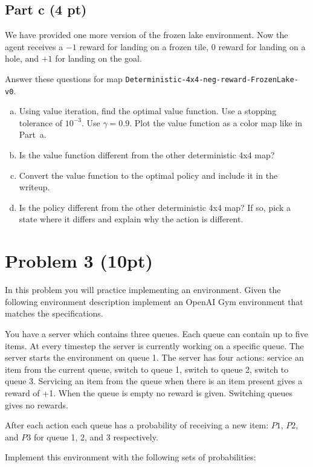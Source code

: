 \documentclass[12pt]{article}
\begin{document}
\subsection*{Part c (4 pt)}

We have provided one more version of the frozen lake environment. Now
the agent receives a $-1$ reward for landing on a frozen tile, $0$
reward for landing on a hole, and $+1$ for landing on the goal.

Answer these questions for map \texttt{Deterministic-4x4-neg-reward-FrozenLake-v0}.

\begin{enumerate}[a)]
\item Using value iteration, find the optimal value function. Use a
  stopping tolerance of $10^{-3}$. Use $\gamma=0.9$. Plot the
  value function as a color map like in Part~a.
\item Is the value function different from the other deterministic 4x4 map?
\item Convert the value function to the optimal policy and include it
  in the writeup.
\item Is the policy different from the other deterministic 4x4 map? If
  so, pick a state where it differs and explain why the action is different.
\end{enumerate}


\section*{Problem 3 (10pt)}

In this problem you will practice implementing an environment. Given
the following environment description implement an OpenAI Gym
environment that matches the specifications.

You have a server which contains three queues. Each queue can contain
up to five items. At every timestep the server is currently working on
a specific queue. The server starts the environment on queue 1. The
server has four actions: service an item from the current queue,
switch to queue 1, switch to queue 2, switch to queue 3. Servicing an
item from the queue when there is an item present gives a reward of
+1. When the queue is empty no reward is given. Switching queues gives
no rewards.

After each action each queue has a probability of receiving a new
item: $P1$, $P2$, and $P3$ for queue 1, 2, and 3 respectively.

Implement this environment with the following sets of probabilities:
  
\end{document}
